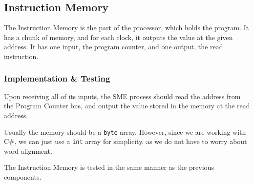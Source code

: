 \subsection{Instruction Memory}
The Instruction Memory is the part of the processor, which holds the program.
It has a chunk of memory, and for each clock, it outputs the value at the given
address. It has one input, the program counter, and one output, the read
instruction.

\subsubsection*{Implementation \& Testing}
Upon receiving all of its inputs, the SME process should read the address from
the Program Counter bus, and output the value stored in the memory at the read
address.

Usually the memory should be a \texttt{byte} array. However, since we are
working with C\#, we can just use a \texttt{int} array for simplicity, as we do
not have to worry about word alignment.

The Instruction Memory is tested in the same manner as the previous components.

